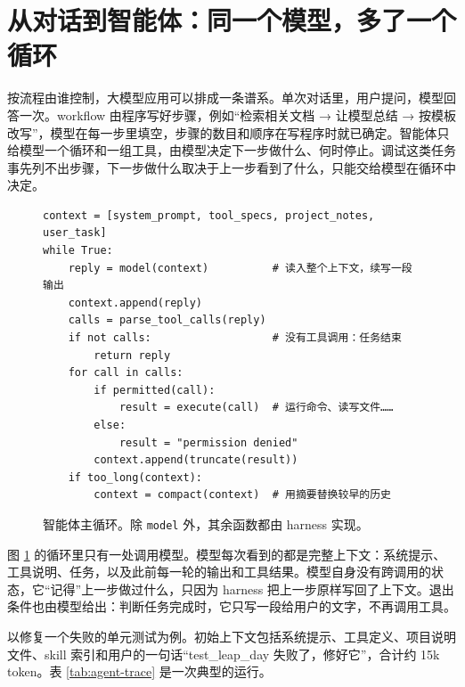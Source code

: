\section{从对话到智能体：同一个模型，多了一个循环}
\label{sec:agent-loop}

按流程由谁控制，大模型应用可以排成一条谱系。单次对话里，用户提问，模型回答一次。workflow 由程序写好步骤，例如“检索相关文档 → 让模型总结 → 按模板改写”，模型在每一步里填空，步骤的数目和顺序在写程序时就已确定。智能体只给模型一个循环和一组工具，由模型决定下一步做什么、何时停止。调试这类任务事先列不出步骤，下一步做什么取决于上一步看到了什么，只能交给模型在循环中决定。

\begin{figure}[ht]
\centering
\begin{tcolorbox}[enhanced,colback=Mist,colframe=Slate,boxrule=0.5pt,arc=2mm,width=0.9\textwidth,left=4mm]
\small
\begin{verbatim}
context = [system_prompt, tool_specs, project_notes, user_task]
while True:
    reply = model(context)          # 读入整个上下文，续写一段输出
    context.append(reply)
    calls = parse_tool_calls(reply)
    if not calls:                   # 没有工具调用：任务结束
        return reply
    for call in calls:
        if permitted(call):
            result = execute(call)  # 运行命令、读写文件……
        else:
            result = "permission denied"
        context.append(truncate(result))
    if too_long(context):
        context = compact(context)  # 用摘要替换较早的历史
\end{verbatim}
\end{tcolorbox}
\caption{智能体主循环。除 \texttt{model} 外，其余函数都由 harness 实现。}
\label{fig:agent-loop}
\end{figure}

图 \ref{fig:agent-loop} 的循环里只有一处调用模型。模型每次看到的都是完整上下文：系统提示、工具说明、任务，以及此前每一轮的输出和工具结果。模型自身没有跨调用的状态，它“记得”上一步做过什么，只因为 harness 把上一步原样写回了上下文。退出条件也由模型给出：判断任务完成时，它只写一段给用户的文字，不再调用工具。

以修复一个失败的单元测试为例。初始上下文包括系统提示、工具定义、项目说明文件、skill 索引和用户的一句话“test\_leap\_day 失败了，修好它”，合计约 15k token。表 \ref{tab:agent-trace} 是一次典型的运行。

